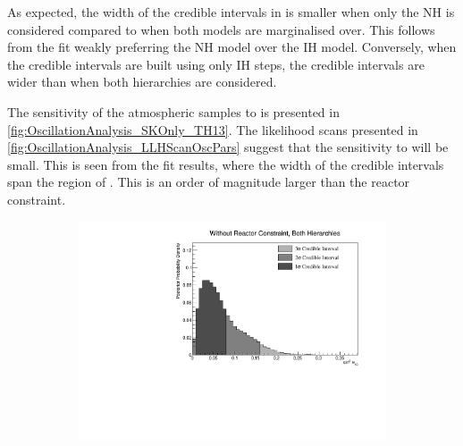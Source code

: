 As expected, the width of the credible intervals in \delmsqatm is smaller when only the NH is considered compared to when both models are marginalised over. This follows from the fit weakly preferring the NH model over the IH model. Conversely, when the credible intervals are built using only IH steps, the credible intervals are wider than when both hierarchies are considered.

The sensitivity of the atmospheric samples to \sinsqreac is presented in \autoref{fig:OscillationAnalysis_SKOnly_TH13}. The likelihood scans presented in \autoref{fig:OscillationAnalysis_LLHScanOscPars} suggest that the sensitivity to \sinsqreac will be small. This is seen from the fit results, where the width of the \quickmath{1\sigma} credible intervals span the region of . This is an order of magnitude larger than the reactor constraint.

\begin{figure}[h]
  \begin{subfigure}[t]{1.0\textwidth}
    \includegraphics[width=\textwidth, trim={0mm 0mm 0mm 0mm}, clip,page=1]{Figures/OA/SKOnlyFit/Contours_1D_th13_BH_1_woRC_UnSmeared_CredibleInterval.pdf}
  \end{subfigure}
  \caption{}
  \label{fig:OscillationAnalysis_SKOnly_TH13}
\end{figure}

